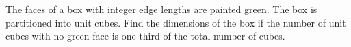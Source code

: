 The faces of a box with integer edge lengths are painted green. The box is partitioned into unit cubes. Find the dimensions of the box if the number of unit cubes with no green face is one third of the total number of cubes.